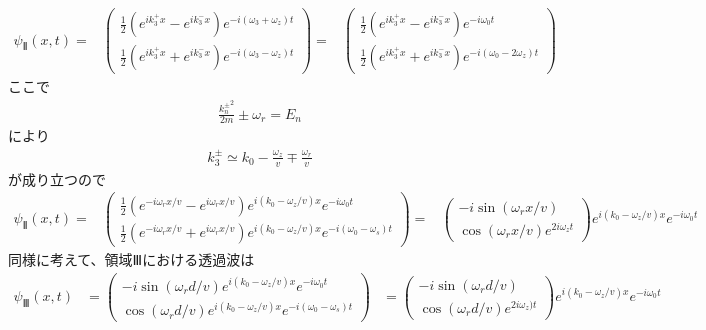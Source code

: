 \begin{align}
{\psi}_{Ⅱ}(x,t) 
=&\begin{pmatrix}
\frac{1}{2}\left(e^{ik_{3}^{+}x}-e^{ik_{3}^{-}x}\right)e^{-i(\omega_{3}+\omega_{z})t} \\
\frac{1}{2}\left(e^{ik_{3}^{+}x}+e^{ik_{3}^{-}x}\right)e^{-i(\omega_{3}-\omega_{z})t}
\end{pmatrix}
=&\begin{pmatrix}
\frac{1}{2}\left(e^{ik_{3}^{+}x}-e^{ik_{3}^{-}x}\right)e^{-i\omega_{0}t} \\
\frac{1}{2}\left(e^{ik_{3}^{+}x}+e^{ik_{3}^{-}x}\right)e^{-i(\omega_{0}-2\omega_{z})t}
\end{pmatrix}
\end{align}
ここで
\begin{align}
\frac{{k_{n}^{\pm}}^2}{2m}{\pm}\omega_{r}=E_{n}
\end{align}
により
\begin{align}
k_{3}^{\pm}{\simeq}k_{0}-\frac{\omega_{z}}{v}{\mp}\frac{\omega_{r}}{v}
\end{align}
が成り立つので
\begin{align}
{\psi}_{Ⅱ}(x,t) 
=&\begin{pmatrix}
\frac{1}{2}\left(e^{-i{\omega_{r}}x/v}-e^{i{\omega_{r}}x/v}\right)e^{i(k_{0}-\omega_{z}/v)x}e^{-i\omega_{0}t} \\
\frac{1}{2}\left(e^{-i{\omega_{r}}x/v}+e^{i{\omega_{r}}x/v}\right)e^{i(k_{0}-\omega_{z}/v)x}e^{-i(\omega_{0}-\omega_{s})t}
\end{pmatrix}
=&\begin{pmatrix}
-i\sin({{\omega_{r}}x/v}) \\
\cos({{\omega_{r}}x/v})e^{2i\omega_{z}t}
\end{pmatrix}
e^{i(k_{0}-\omega_{z}/v)x}e^{-i\omega_{0}t} 
\end{align}
同様に考えて、領域Ⅲにおける透過波は
\begin{align}
{\psi}_{Ⅲ}(x,t) 
&=\begin{pmatrix}
-i\sin({{\omega_{r}}d/v})e^{i(k_{0}-\omega_{z}/v)x}e^{-i\omega_{0}t} \\
\cos({{\omega_{r}}d/v})e^{i(k_{0}-\omega_{z}/v)x}e^{-i(\omega_{0}-\omega_{s})t}
\end{pmatrix}
&=\begin{pmatrix}
-i\sin({{\omega_{r}}d/v}) \\
\cos({{\omega_{r}}d/v})e^{2i\omega_{z})t}
\end{pmatrix}
e^{i(k_{0}-\omega_{z}/v)x}e^{-i\omega_{0}t}
\end{align}
